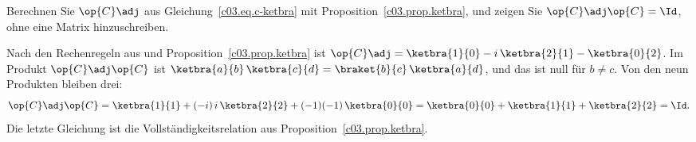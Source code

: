 \begin{exercise}\label{c03.exc.ketbra}
  Berechnen Sie $\op{C}\adj$ aus Gleichung~\eqref{c03.eq.c-ketbra} mit
  Proposition~\ref{c03.prop.ketbra}, und zeigen Sie $\op{C}\adj\op{C} = \Id$, ohne eine Matrix
  hinzuschreiben.
\end{exercise}
\begin{solution}
  Nach den Rechenregeln aus  und Proposition~\ref{c03.prop.ketbra} ist
  $\op{C}\adj = \ketbra{1}{0} - i\, \ketbra{2}{1} - \ketbra{0}{2}$. Im Produkt
  $\op{C}\adj\op{C}$ ist $\ketbra{a}{b}\, \ketbra{c}{d} = \braket{b}{c}\, \ketbra{a}{d}$, und
  das ist null für $b \neq c$. Von den neun Produkten bleiben drei:
  \begin{equation}\label{c03.eq.c-ketbra-unitaer}
    \op{C}\adj\op{C}
    = \ketbra{1}{1} + (-i)\, i\, \ketbra{2}{2} + (-1)(-1)\, \ketbra{0}{0}
    = \ketbra{0}{0} + \ketbra{1}{1} + \ketbra{2}{2}
    = \Id .
  \end{equation}
  Die letzte Gleichung ist die Vollständigkeitsrelation aus Proposition~\ref{c03.prop.ketbra}.
\end{solution}

